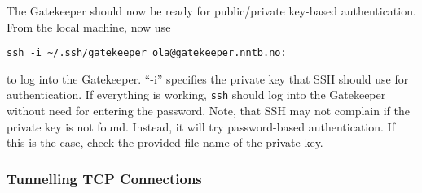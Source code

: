 The Gatekeeper should now be ready for public/private key-based authentication. From the local machine, now use
\begin{lstlisting}
ssh -i ~/.ssh/gatekeeper ola@gatekeeper.nntb.no:
\end{lstlisting}
to log into the Gatekeeper. ``-i'' specifies the private key that SSH should use for authentication. If everything is working, \texttt{ssh} should log into the Gatekeeper without need for entering the password. Note, that SSH may not complain if the private key is not found. Instead, it will try password-based authentication. If this is the case, check the provided file name of the private key.


\subsubsection{Tunnelling TCP Connections}
\label{subsub:Tunnelling-TCP-Connections}

